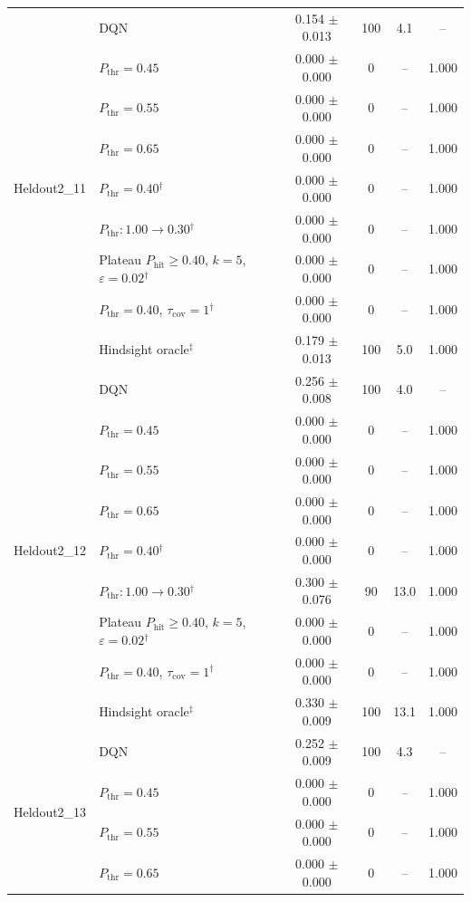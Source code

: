 \begin{table}[htbp]
\begin{tabular}{llcccc}
\midrule
\multirow{9}{*}{Heldout2\_11} & DQN & 0.154 $\pm$ 0.013 & 100 & 4.1 & -- \\
 & $P_{\mathrm{thr}}=0.45$ & 0.000 $\pm$ 0.000 & 0 & -- & 1.000 \\
 & $P_{\mathrm{thr}}=0.55$ & 0.000 $\pm$ 0.000 & 0 & -- & 1.000 \\
 & $P_{\mathrm{thr}}=0.65$ & 0.000 $\pm$ 0.000 & 0 & -- & 1.000 \\
 & $P_{\mathrm{thr}}=0.40$$^{\dagger}$ & 0.000 $\pm$ 0.000 & 0 & -- & 1.000 \\
 & $P_{\mathrm{thr}}: 1.00 \to 0.30$$^{\dagger}$ & 0.000 $\pm$ 0.000 & 0 & -- & 1.000 \\
 & Plateau $P_{\mathrm{hit}}\geq0.40$, $k=5$, $\varepsilon=0.02$$^{\dagger}$ & 0.000 $\pm$ 0.000 & 0 & -- & 1.000 \\
 & $P_{\mathrm{thr}}=0.40$, $\tau_{\mathrm{cov}}=1$$^{\dagger}$ & 0.000 $\pm$ 0.000 & 0 & -- & 1.000 \\
 & Hindsight oracle$^{\ddagger}$ & 0.179 $\pm$ 0.013 & 100 & 5.0 & 1.000 \\
\midrule
\multirow{9}{*}{Heldout2\_12} & DQN & 0.256 $\pm$ 0.008 & 100 & 4.0 & -- \\
 & $P_{\mathrm{thr}}=0.45$ & 0.000 $\pm$ 0.000 & 0 & -- & 1.000 \\
 & $P_{\mathrm{thr}}=0.55$ & 0.000 $\pm$ 0.000 & 0 & -- & 1.000 \\
 & $P_{\mathrm{thr}}=0.65$ & 0.000 $\pm$ 0.000 & 0 & -- & 1.000 \\
 & $P_{\mathrm{thr}}=0.40$$^{\dagger}$ & 0.000 $\pm$ 0.000 & 0 & -- & 1.000 \\
 & $P_{\mathrm{thr}}: 1.00 \to 0.30$$^{\dagger}$ & 0.300 $\pm$ 0.076 & 90 & 13.0 & 1.000 \\
 & Plateau $P_{\mathrm{hit}}\geq0.40$, $k=5$, $\varepsilon=0.02$$^{\dagger}$ & 0.000 $\pm$ 0.000 & 0 & -- & 1.000 \\
 & $P_{\mathrm{thr}}=0.40$, $\tau_{\mathrm{cov}}=1$$^{\dagger}$ & 0.000 $\pm$ 0.000 & 0 & -- & 1.000 \\
 & Hindsight oracle$^{\ddagger}$ & 0.330 $\pm$ 0.009 & 100 & 13.1 & 1.000 \\
\midrule
\multirow{9}{*}{Heldout2\_13} & DQN & 0.252 $\pm$ 0.009 & 100 & 4.3 & -- \\
 & $P_{\mathrm{thr}}=0.45$ & 0.000 $\pm$ 0.000 & 0 & -- & 1.000 \\
 & $P_{\mathrm{thr}}=0.55$ & 0.000 $\pm$ 0.000 & 0 & -- & 1.000 \\
 & $P_{\mathrm{thr}}=0.65$ & 0.000 $\pm$ 0.000 & 0 & -- & 1.000 \\

\end{tabular}
\end{table}
